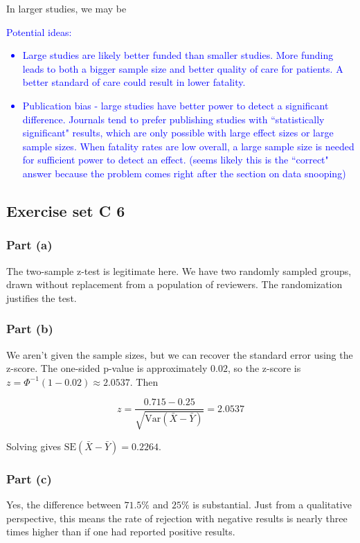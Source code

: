 \documentclass[11pt]{article}
\newcommand{\var}{\textrm{Var}}
\begin{document}
In larger studies, we may be 

\textcolor{blue}{Potential ideas:
\begin{itemize}
\item Large studies are likely better funded than smaller studies. More funding leads to both a bigger sample size and better quality of care for patients.  A better standard of care could result in lower fatality.
\item Publication bias - large studies have better power to detect a significant difference. Journals tend to prefer publishing studies with ``statistically significant" results, which are only possible with large effect sizes or large sample sizes.  When fatality rates are low overall, a large sample size is needed for sufficient power to detect an effect. (seems likely this is the ``correct" answer because the problem comes right after the section on data snooping)
\end{itemize}} %




\subsection*{Exercise set C 6} %
\subsubsection*{Part (a)}
The two-sample z-test is legitimate here.  We have two randomly sampled groups, drawn without replacement from a population of reviewers.  The randomization justifies the test.

\subsubsection*{Part (b)}
We aren't given the sample sizes, but we can recover the standard error using the z-score.  The one-sided p-value is approximately $0.02$, so the z-score is $z = \Phi^{-1}(1 - 0.02) \approx 2.0537$.  Then

$$ z = \frac{0.715 - 0.25}{\sqrt{\var(\bar{X} - \bar{Y})}} = 2.0537$$

Solving gives $\text{SE}(\bar{X} - \bar{Y}) = 0.2264$.

\subsubsection*{Part (c)}
Yes, the difference between $71.5\%$ and $25\%$ is substantial.  Just from a qualitative perspective, this means the rate of rejection with negative results is nearly three times higher than if one had reported positive results.
\end{document}

